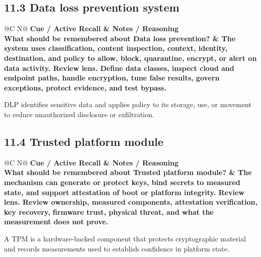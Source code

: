 \documentclass[11pt]{article}
\newcommand{\CornellHeader}{\rowcolor{Navy}\color{white}\bfseries Cue / Active Recall & \color{white}\bfseries Notes / Reasoning \\\endhead}
\newcommand{\CornellRow}[2]{\cellcolor{CueGray}\textbf{#1} & #2 \\\addlinespace[3pt]}
\begin{document}
\subsection{11.3 Data loss prevention system}
\begin{longtable}{@{}C N@{}}
\CornellHeader
\CornellRow{What should be remembered about Data loss prevention?}{The system uses classification, content inspection, context, identity, destination, and policy to allow, block, quarantine, encrypt, or alert on data activity. \textbf{Review lens.} Define data classes, inspect cloud and endpoint paths, handle encryption, tune false results, govern exceptions, protect evidence, and test bypass.}
\end{longtable}
\begin{sectionsummarybox}
DLP identifies sensitive data and applies policy to its storage, use, or movement to reduce unauthorized disclosure or exfiltration.
\end{sectionsummarybox}
\subsection{11.4 Trusted platform module}
\begin{longtable}{@{}C N@{}}
\CornellHeader
\CornellRow{What should be remembered about Trusted platform module?}{The mechanism can generate or protect keys, bind secrets to measured state, and support attestation of boot or platform integrity. \textbf{Review lens.} Review ownership, measured components, attestation verification, key recovery, firmware trust, physical threat, and what the measurement does not prove.}
\end{longtable}
\begin{sectionsummarybox}
A TPM is a hardware-backed component that protects cryptographic material and records measurements used to establish confidence in platform state.
\end{sectionsummarybox}
\end{document}
